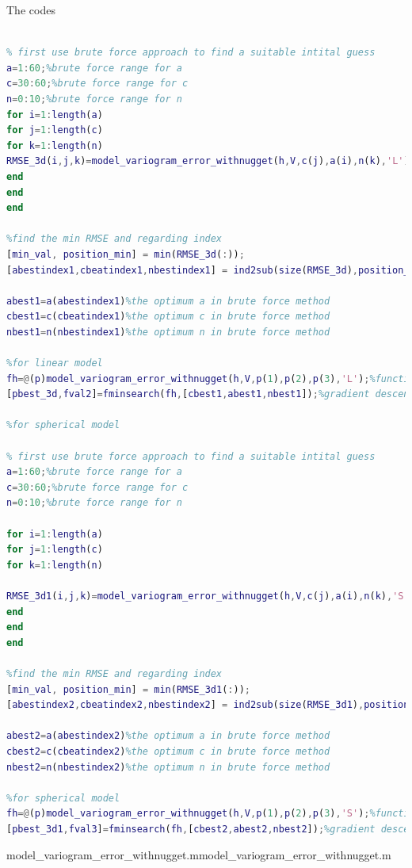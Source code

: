 \documentclass[
	12pt, %
]{fphw}
\begin{document}
The codes
 \begin{lstlisting}[language=Matlab,escapeinside=``]
%for linear model

% first use brute force approach to find a suitable intital guess
a=1:60;%brute force range for a
c=30:60;%brute force range for c
n=0:10;%brute force range for n
for i=1:length(a)
for j=1:length(c)
for k=1:length(n)
RMSE_3d(i,j,k)=model_variogram_error_withnugget(h,V,c(j),a(i),n(k),'L');% calculate RMSE for the all a, c and n
end
end
end

%find the min RMSE and regarding index
[min_val, position_min] = min(RMSE_3d(:)); 
[abestindex1,cbeatindex1,nbestindex1] = ind2sub(size(RMSE_3d),position_min);

abest1=a(abestindex1)%the optimum a in brute force method
cbest1=c(cbeatindex1)%the optimum c in brute force method
nbest1=n(nbestindex1)%the optimum n in brute force method

%for linear model
fh=@(p)model_variogram_error_withnugget(h,V,p(1),p(2),p(3),'L');%function handle
[pbest_3d,fval2]=fminsearch(fh,[cbest1,abest1,nbest1]);%gradient descent method to find best parameters

%for spherical model

% first use brute force approach to find a suitable intital guess
a=1:60;%brute force range for a
c=30:60;%brute force range for c
n=0:10;%brute force range for n

for i=1:length(a)
for j=1:length(c)
for k=1:length(n)

RMSE_3d1(i,j,k)=model_variogram_error_withnugget(h,V,c(j),a(i),n(k),'S');% calculate RMSE for the all a, c and n
end
end
end

%find the min RMSE and regarding index
[min_val, position_min] = min(RMSE_3d1(:)); 
[abestindex2,cbeatindex2,nbestindex2] = ind2sub(size(RMSE_3d1),position_min);

abest2=a(abestindex2)%the optimum a in brute force method
cbest2=c(cbeatindex2)%the optimum c in brute force method
nbest2=n(nbestindex2)%the optimum n in brute force method

%for spherical model
fh=@(p)model_variogram_error_withnugget(h,V,p(1),p(2),p(3),'S');%function handle
[pbest_3d1,fval3]=fminsearch(fh,[cbest2,abest2,nbest2]);%gradient descent method to find best parameters

\end{lstlisting}
 
model\_variogram\_error\_withnugget.mmodel\_variogram\_error\_withnugget.m  
\end{document}
